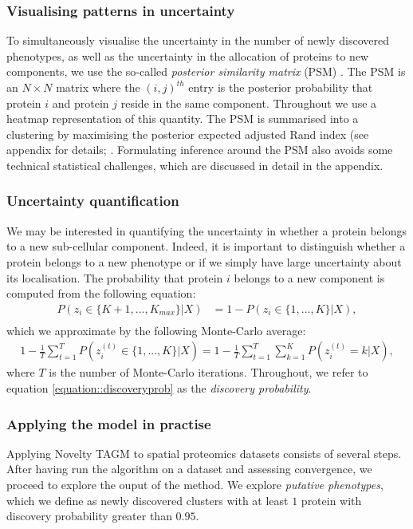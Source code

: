 \documentclass[12pt,english]{article}
\begin{document}
\subsubsection{Visualising patterns in uncertainty}
To simultaneously visualise the uncertainty in the number of newly discovered phenotypes, as well as the uncertainty in the allocation of proteins to new components, we use the so-called \textit{posterior similarity matrix} (PSM) \citep{fritsch::2009}. The PSM is an $N\times N$ matrix where the $(i,j)^{th}$ entry is the posterior probability that protein $i$ and protein $j$ reside in the same component. Throughout we use a heatmap representation of this quantity. The PSM is summarised into a clustering by maximising the posterior expected adjusted Rand index (see appendix for details; \citep{fritsch::2009}. Formulating inference around the PSM also avoids some technical statistical challenges, which are discussed in detail in the appendix.

\subsubsection{Uncertainty quantification}
We may be interested in quantifying the uncertainty in whether a protein belongs to a new sub-cellular component. Indeed, it is important to distinguish whether a protein belongs to a new phenotype or if we simply have large uncertainty about its localisation. The probability that protein $i$ belongs to a new component is computed from the following equation:
\begin{align}
P(z_i \in \{K + 1,..., K_{max}\}|X) & = 1 - P(z_i \in \{1,..., K\}|X), \\ 
\end{align}
which we approximate by the following Monte-Carlo average:
\begin{align}\label{equation::discoveryprob}
1 - \frac{1}{T} \sum_{t = 1}^{T}P(z^{(t)}_i \in \{1,..., K\}|X)= 1 - \frac{1}{T} \sum_{t = 1}^{T} \sum_{k=1}^KP(z^{(t)}_i = k|X),
\end{align}
where $T$ is the number of Monte-Carlo iterations. Throughout, we refer to equation \ref{equation::discoveryprob} as the \textit{discovery probability}.
\subsubsection{Applying the model in practise}
Applying Novelty TAGM to spatial proteomics datasets consists of several steps. After having run the algorithm on a dataset and assessing convergence, we proceed to explore the ouput of the method. We explore \textit{putative phenotypes}, which we define as newly discovered clusters with at least $1$ protein with discovery probability greater than $0.95$.
\end{document}
